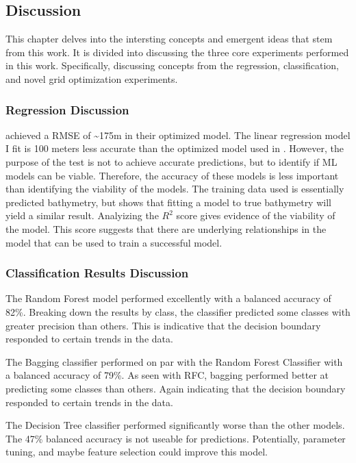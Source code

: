 \subsection{Discussion}
\setlength{\parindent}{10ex}
This chapter delves into the intersting concepts and emergent ideas that stem from this work.
It is divided into discussing the three core experiments performed in this work.
Specifically, discussing concepts from the regression, classification, and novel grid optimization experiments.

\subsubsection{Regression Discussion}
\cite{jena2012prediction} achieved a \ac{RMSE} of \~{}175m in their optimized model.
The linear regression model I fit is 100 meters less accurate than the optimized model used in \cite{jena2012prediction}.
However, the purpose of the test is not to achieve accurate predictions, but to identify if \ac{ML} models can be viable.
Therefore, the accuracy of these models is less important than identifying the viability of the models.
The training data used is essentially predicted bathymetry, but shows that fitting a model to true bathymetry will yield a similar result.
Analyizing the \(R^2\) score gives evidence of the viability of the model.
This score suggests that there are underlying relationships in the model that can be used to train a successful model.

\subsubsection{Classification Results Discussion}
The Random Forest model performed excellently with a balanced accuracy of 82\%.
Breaking down the results by class, the classifier predicted some classes with greater precision than others.
This is indicative that the decision boundary responded to certain trends in the data.

\par
The Bagging classifier performed on par with the Random Forest Classifier with a balanced accuracy of 79\%.
As seen with \ac{RFC}, bagging performed better at predicting some classes than others.
Again indicating that the decision boundary responded to certain trends in the data.

\par
The Decision Tree classifier performed significantly worse than the other models.
The 47\% balanced accuracy is not useable for predictions.
Potentially, parameter tuning, and maybe feature selection could improve this model.

